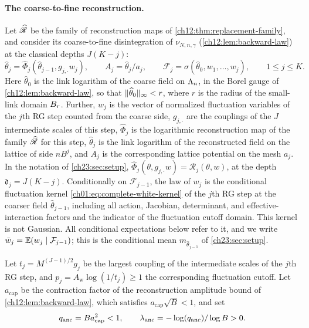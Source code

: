 \paragraph{The coarse-to-fine reconstruction.}
Let $\widehat{\mathscr R}$ be the family of reconstruction maps of \cref{ch12:thm:replacement-family}, and consider its coarse-to-fine disintegration of $\nu_{N,n,\gamma}$ (\cref{ch12:lem:backward-law}) at the classical depths $J(K-j)$:
\[
 \widehat\theta_j=\widehat\Phi_j(\widehat\theta_{j-1},g_{j,\cdot}w_j),\qquad
 A_j=\widehat\theta_j/a_j,\qquad
 \mathcal F_j=\sigma(\widehat\theta_0,w_1,\ldots,w_j),\qquad 1\le j\le K.
\]
Here $\widehat\theta_0$ is the link logarithm of the coarse field on $\Lambda_{n}$, in the Borel gauge of \cref{ch12:lem:backward-law}, so that $\lVert \widehat\theta_0\rVert_\infty<r$, where $r$ is the radius of the small-link domain $B_{r}$. Further, $w_j$ is the vector of normalized fluctuation variables of the $j$th RG step counted from the coarse side, $g_{j,\cdot}$ are the couplings of the $J$ intermediate scales of this step, $\widehat\Phi_j$ is the logarithmic reconstruction map of the family $\widehat{\mathscr R}$ for this step, $\widehat\theta_j$ is the link logarithm of the reconstructed field on the lattice of side $nB^j$, and $A_j$ is the corresponding lattice potential on the mesh $a_j$. In the notation of \cref{ch23:sec:setup}, $\widehat\Phi_j(\theta,g_{j,\cdot}w)=\mathscr R_j(\theta,w)$, at the depth $\mathfrak d_j=J(K-j)$. Conditionally on $\mathcal F_{j-1}$, the law of $w_j$ is the conditional fluctuation kernel \eqref{ch01:eq:complete-white-kernel} of the $j$th RG step at the coarser field $\widehat\theta_{j-1}$, including all action, Jacobian, determinant, and effective-interaction factors and the indicator of the fluctuation cutoff domain. This kernel is not Gaussian. All conditional expectations below refer to it, and we write $\bar w_j=\mathbb E(w_j\mid\mathcal F_{j-1})$; this is the conditional mean $m_{\widehat\theta_{j-1}}$ of \cref{ch23:sec:setup}.

Let $t_j=M^{(J-1)/2}g_j$ be the largest coupling of the intermediate scales of the $j$th RG step, and $p_j=A_{\mathrm w}\log(1/t_j)\ge1$ the corresponding fluctuation cutoff. Let $a_{\mathrm{cap}}$ be the contraction factor of the reconstruction amplitude bound of \cref{ch12:lem:backward-law}, which satisfies $a_{\mathrm{cap}}\sqrt B<1$, and set
\[
 q_{\mathrm{anc}}=Ba_{\mathrm{cap}}^2<1,\qquad \lambda_{\mathrm{anc}}=-\log(q_{\mathrm{anc}})/\log B>0.
\]

